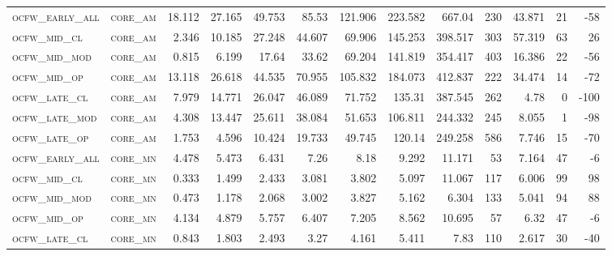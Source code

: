 \begin{landscape}
\begin{center}
\begin{footnotesize}
\begin{longtable}{llrrrrrrrr|rrr}
\textsc{ocfw\_early\_all} & \textsc{core\_am  }   & 18.112   & 27.165   & 49.753   & 85.53    & 121.906  & 223.582  & 667.04   & 230    & 43.871        & 21            & -58             \\
\textsc{ocfw\_mid\_cl   } & \textsc{core\_am  }   & 2.346    & 10.185   & 27.248   & 44.607   & 69.906   & 145.253  & 398.517  & 303    & 57.319        & 63            & 26              \\
\textsc{ocfw\_mid\_mod  } & \textsc{core\_am  }   & 0.815    & 6.199    & 17.64    & 33.62    & 69.204   & 141.819  & 354.417  & 403    & 16.386        & 22            & -56             \\
\textsc{ocfw\_mid\_op   } & \textsc{core\_am  }   & 13.118   & 26.618   & 44.535   & 70.955   & 105.832  & 184.073  & 412.837  & 222    & 34.474        & 14            & -72             \\
\textsc{ocfw\_late\_cl  } & \textsc{core\_am  }   & 7.979    & 14.771   & 26.047   & 46.089   & 71.752   & 135.31   & 387.545  & 262    & 4.78          & 0             & -100            \\
\textsc{ocfw\_late\_mod } & \textsc{core\_am  }   & 4.308    & 13.447   & 25.611   & 38.084   & 51.653   & 106.811  & 244.332  & 245    & 8.055         & 1             & -98             \\
\textsc{ocfw\_late\_op  } & \textsc{core\_am  }   & 1.753    & 4.596    & 10.424   & 19.733   & 49.745   & 120.14   & 249.258  & 586    & 7.746         & 15            & -70             \\
\textsc{ocfw\_early\_all} & \textsc{core\_mn  }   & 4.478    & 5.473    & 6.431    & 7.26     & 8.18     & 9.292    & 11.171   & 53     & 7.164         & 47            & -6              \\
\textsc{ocfw\_mid\_cl   } & \textsc{core\_mn  }   & 0.333    & 1.499    & 2.433    & 3.081    & 3.802    & 5.097    & 11.067   & 117    & 6.006         & 99            & 98              \\
\textsc{ocfw\_mid\_mod  } & \textsc{core\_mn  }   & 0.473    & 1.178    & 2.068    & 3.002    & 3.827    & 5.162    & 6.304    & 133    & 5.041         & 94            & 88              \\
\textsc{ocfw\_mid\_op   } & \textsc{core\_mn  }   & 4.134    & 4.879    & 5.757    & 6.407    & 7.205    & 8.562    & 10.695   & 57     & 6.32          & 47            & -6              \\
\textsc{ocfw\_late\_cl  } & \textsc{core\_mn  }   & 0.843    & 1.803    & 2.493    & 3.27     & 4.161    & 5.411    & 7.83     & 110    & 2.617         & 30            & -40             \\

\end{longtable}
\end{footnotesize}
\end{center}
\end{landscape}
